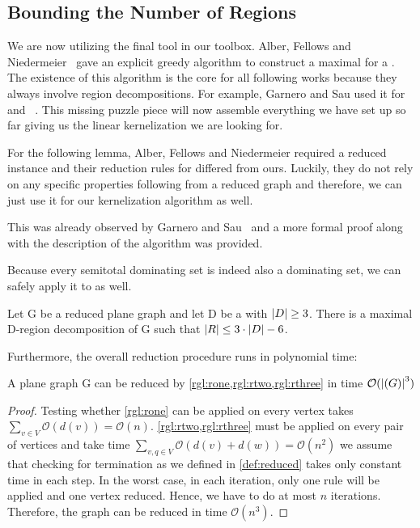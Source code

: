 \subsection{Bounding the Number of Regions}

We are now utilizing the final tool in our toolbox. Alber, Fellows and Niedermeier~\cite[Proposition 1]{Alber2004} gave an explicit greedy algorithm to construct a maximal \dreg for a \dom. 
The existence of this algorithm is the core for all following works because they always involve region decompositions. For example, Garnero and Sau used it for \rbdom~\cite{Garnero2017} and \tdom~\cite{Garnero2018}. This missing puzzle piece will now assemble everything we have set up so far giving us the linear kernelization we are looking for.

For the following lemma, Alber, Fellows and Niedermeier\cite{Alber2004} required a reduced instance and their reduction rules for \pdom differed from ours. Luckily, they do not rely on any specific properties following from a reduced graph and therefore, we can just use it for our kernelization algorithm as well.

This was already observed by Garnero and Sau~\cite{Garnero2018} and a more formal proof along with the description of the algorithm was provided.

Because every semitotal dominating set is indeed also a dominating set, we can safely apply it to \psdom as well. 

\begin{lemma}\label{lemma:numRegions}
    Let G be a reduced plane graph and let D be a \sdom with $\abs{D}\geq 3$. There is a maximal D-region decomposition of G such that $\abs{R} \leq 3 \cdot \abs{D} - 6$.
\end{lemma}

Furthermore, the overall reduction procedure runs in polynomial time:

\begin{lemma}\label{lemma:runtime}
    A plane graph G can be reduced by \cref{rgl:rone,rgl:rtwo,rgl:rthree} in time $\mathcal{O}(\abs{(G)}^3)$
\end{lemma}
\begin{proof} 
Testing whether \cref{rgl:rone} can be applied on every vertex takes $\sum_{v\in V} \mathcal{O}(d(v)) = \mathcal{O}(n)$.
\cref{rgl:rtwo,rgl:rthree} must be applied on every pair of vertices and take time $\sum_{v,q \in V}\mathcal{O}(d(v) + d(w)) = \mathcal{O}(n^2)$
we assume that checking for termination as we defined in \cref{def:reduced} takes only constant time in each step.
In the worst case, in each iteration, only one rule will be applied and one vertex reduced. 
Hence, we have to do at most $n$ iterations.
Therefore, the graph can be reduced in time $\mathcal{O}(n^3)$.
\end{proof}


